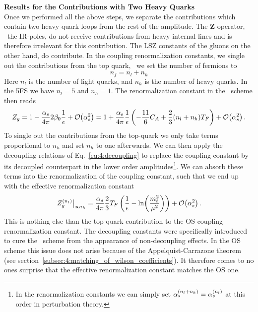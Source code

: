 \textbf{Results for the Contributions with Two Heavy Quarks} \\
Once we performed all the above steps, we separate the contributions which contain two heavy quark loops from the rest of the amplitude. The $\mathbf{Z}$ operator, \ie\ the \acs{IR}-poles, do not receive contributions from heavy internal lines and is therefore irrelevant for this contribution. The LSZ constants of the gluons on the other hand, do contribute. In the coupling renormalization constants, we single out the contributions from the top quark, \ie\ we set the number of fermions to
\begin{equation}
n_f = n_l + n_h
\end{equation}
Here $n_l$ is the number of light quarks, and $n_h$ is the number of heavy quarks. In the 5\acs{FS} we have $n_l = 5$ and $n_h = 1$. The renormalization constant in the \MS\ scheme then reads
\begin{equation}
Z_g = 1 - \frac{\alpha_s}{4 \pi}  2 \beta_0 \frac{1}{\epsilon} + \mathcal{O}\!\left(\alpha_s^2\right) = 1 + \frac{\alpha_s}{4 \pi} \frac{1}{\epsilon} \left(- \frac{11}{6} C_A + \frac{2}{3} (n_l + n_h) T_F \right) + \mathcal{O}\!\left(\alpha_s^2\right).
\end{equation}
To single out the contributions from the top-quark we only take terms proportional to $n_h$ and set $n_h$ to one afterwards. We can then apply the decoupling relations of Eq.~\eqref{eq:4:decoupling} to replace the coupling constant by its decoupled counterpart in the lower order amplitudes\footnote{In the renormalization constants we can simply set $\alpha_s^{(n_l + n_h)} = \alpha_s^{(n_l)}$ at this order in perturbation theory.}. We can absorb these terms into the renormalization of the coupling constant, such that we end up with the effective renormalization constant
\begin{equation}
Z_g^{(n_l)} \big \vert_{\propto n_h} = \frac{\alpha_s}{4 \pi} \frac{2}{3} T_F \left(\frac{1}{\epsilon} - \ln\!\left(\frac{m_t^2}{\mu^2}\right) \right) + \mathcal{O}\!\left(\alpha_s^2\right).
\end{equation}
This is nothing else than the top-quark contribution to the \acs{OS} coupling renormalization constant. The decoupling constants were specifically introduced to cure the \MS\ scheme from the appearance of non-decoupling effects. In the \acs{OS} scheme this issue does not arise because of the Appelquist-Carrazone theorem (see section~\ref{subsec:4:matching_of_wilson_coefficients}). It therefore comes to no ones surprise that the effective renormalization constant matches the OS one.

